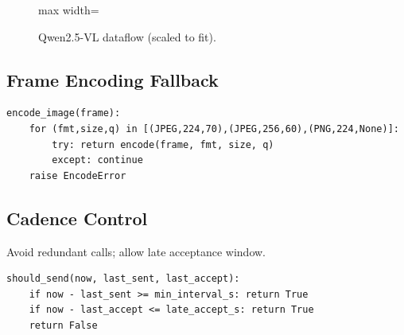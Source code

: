 \documentclass[11pt,a4paper]{article}
\begin{document}
\begin{figure}[h]
    \centering
    \begin{adjustbox}{max width=\textwidth}
    \end{adjustbox}
    \caption{Qwen2.5-VL dataflow (scaled to fit).}
    \label{fig:vlm-dataflow}
\end{figure}

\subsection{Frame Encoding Fallback}
\begin{lstlisting}[style=code]
encode_image(frame):
    for (fmt,size,q) in [(JPEG,224,70),(JPEG,256,60),(PNG,224,None)]:
        try: return encode(frame, fmt, size, q)
        except: continue
    raise EncodeError
\end{lstlisting}

\subsection{Cadence Control}
Avoid redundant calls; allow late acceptance window.
\begin{lstlisting}[style=code]
should_send(now, last_sent, last_accept):
    if now - last_sent >= min_interval_s: return True
    if now - last_accept <= late_accept_s: return True
    return False
\end{lstlisting}
\end{document}

